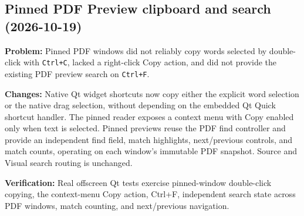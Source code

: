 \documentclass[a4paper]{article}
\title{}
\date{}
\author{Mohammad Rahmani}
\begin{document}
   \maketitle
   \begin{preview}
\section*{Pinned PDF Preview clipboard and search (2026-10-19)}

\textbf{Problem:} Pinned PDF windows did not reliably copy words selected by
double-click with \texttt{Ctrl+C}, lacked a right-click Copy action, and did
not provide the existing PDF preview search on \texttt{Ctrl+F}.

\textbf{Changes:} Native Qt widget shortcuts now copy either the explicit
word selection or the native drag selection, without depending on the
embedded Qt Quick shortcut handler. The pinned reader exposes a context
menu with Copy enabled only when text is selected. Pinned previews reuse
the PDF find controller and provide an independent find field, match
highlights, next/previous controls, and match counts, operating on each
window's immutable PDF snapshot. Source and Visual search routing is
unchanged.

\textbf{Verification:} Real offscreen Qt tests exercise pinned-window
double-click copying, the context-menu Copy action, Ctrl+F, independent
search state across PDF windows, match counting, and next/previous navigation.
   \end{preview}

   
   
\end{document}
